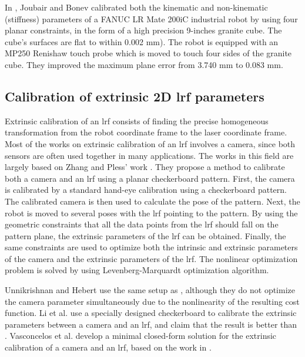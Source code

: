 In \cite{Joubair2015}, Joubair and Bonev calibrated both the kinematic and non-kinematic (stiffness) parameters of a FANUC LR Mate 200iC industrial robot by using four planar constraints, in the form of a high precision 9-inches granite cube. The cube's surfaces are flat to within 0.002 mm). The robot is equipped with an MP250 Renishaw touch probe which is moved to touch four sides of the granite cube. They improved the maximum plane error from 3.740 mm to 0.083 mm. 

\subsection{Calibration of extrinsic 2D \ac{lrf} parameters}
\label{sec:laser_calib}
Extrinsic calibration of an \ac{lrf} consists of finding the precise homogeneous transformation from the robot coordinate frame to the laser coordinate frame. Most of the works on extrinsic calibration of an \ac{lrf} involves a camera, since both sensors are often used together in many applications. The works in this field are largely based on Zhang and Pless' work \cite{Zhang2004}. They propose a method to calibrate both a camera and an \ac{lrf} using a planar checkerboard pattern. First, the camera is calibrated by a standard hand-eye calibration  \cite{BouguetJ.Y.2003} using a checkerboard pattern. The calibrated camera is then used to calculate the pose of the pattern. Next, the robot is moved to several poses with the \ac{lrf} pointing to the pattern. By using the geometric constraints that all the data points from the \ac{lrf} should fall on the pattern plane, the extrinsic parameters of the \ac{lrf} can be obtained. Finally, the same constraints are used to optimize both the intrinsic and extrinsic parameters of the camera and the extrinsic parameters of the \ac{lrf}. The nonlinear optimization problem is solved by using Levenberg-Marquardt optimization algorithm.

Unnikrishnan and Hebert \cite{Unnikrishnan2005} use the same setup as \cite{Zhang2004}, although they do not optimize the camera parameter simultaneously due to the nonlinearity of the resulting cost function. 
Li et al. \cite{Li2007} use a specially designed checkerboard to calibrate the extrinsic parameters between a camera and an \ac{lrf}, and claim that the result is better than \cite{Zhang2004}. Vasconcelos et al. \cite{Vasconcelos2012} develop a minimal closed-form solution for the extrinsic calibration of a camera and an \ac{lrf}, based on the work in \cite{Zhang2004}. 

